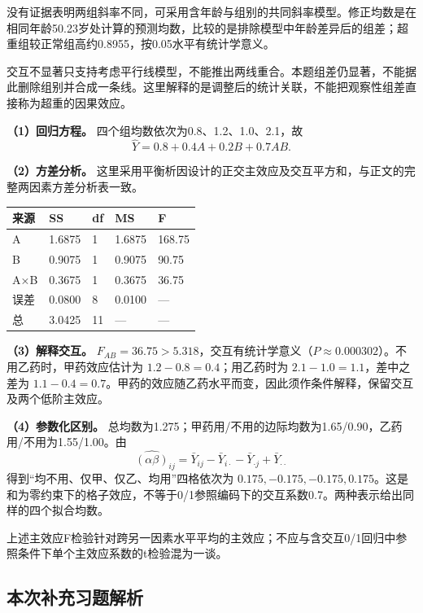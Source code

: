 没有证据表明两组斜率不同，可采用含年龄与组别的共同斜率模型。修正均数是在相同年龄50.23岁处计算的预测均数，比较的是排除模型中年龄差异后的组差；超重组较正常组高约0.8955，按0.05水平有统计学意义。

交互不显著只支持考虑平行线模型，不能推出两线重合。本题组差仍显著，不能据此删除组别并合成一条线。这里解释的是调整后的统计关联，不能把观察性组差直接称为超重的因果效应。





\textbf{（1）回归方程。} 四个组均数依次为0.8、1.2、1.0、2.1，故 \[\hat Y=0.8+0.4A+0.2B+0.7AB.\]

\textbf{（2）方差分析。} 这里采用平衡析因设计的正交主效应及交互平方和，与正文的完整两因素方差分析表一致。

\begin{center}\small\setlength{\tabcolsep}{5pt}\renewcommand{\arraystretch}{1.18}\begin{tabular}{@{}lllll@{}}
\toprule
来源 & SS & df & MS & F \\
\midrule

A & 1.6875 & 1 & 1.6875 & 168.75 \\
B & 0.9075 & 1 & 0.9075 & 90.75 \\
A×B & 0.3675 & 1 & 0.3675 & 36.75 \\
误差 & 0.0800 & 8 & 0.0100 & --- \\
总 & 3.0425 & 11 & --- & --- \\
\bottomrule\end{tabular}\end{center}

\textbf{（3）解释交互。} \(F_{AB}=36.75>5.318\)，交互有统计学意义（\(P\approx0.000302\)）。不用乙药时，甲药效应估计为 \(1.2-0.8=0.4\)；用乙药时为 \(2.1-1.0=1.1\)，差中之差为 \(1.1-0.4=0.7\)。甲药的效应随乙药水平而变，因此须作条件解释，保留交互及两个低阶主效应。

\textbf{（4）参数化区别。} 总均数为1.275；甲药用/不用的边际均数为1.65/0.90，乙药用/不用为1.55/1.00。由 \[\widehat{(\alpha\beta)}_{ij}=\bar Y_{ij}-\bar Y_{i\cdot}-\bar Y_{\cdot j}+\bar Y_{\cdot\cdot}\] 得到``均不用、仅甲、仅乙、均用''四格依次为 \(0.175,-0.175,-0.175,0.175\)。这是和为零约束下的格子效应，不等于0/1参照编码下的交互系数0.7。两种表示给出同样的四个拟合均数。

上述主效应F检验针对跨另一因素水平平均的主效应；不应与含交互0/1回归中参照条件下单个主效应系数的t检验混为一谈。
\subsection*{本次补充习题解析}

\EndExercises

